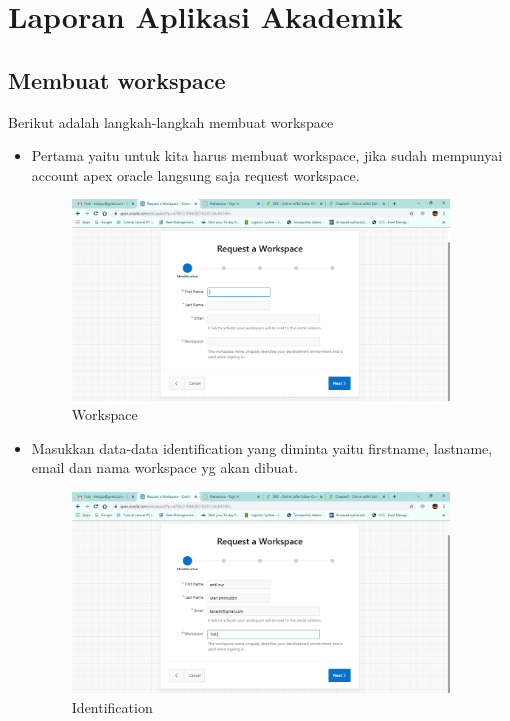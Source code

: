 \chapter{Laporan Aplikasi Akademik}
\section{Membuat workspace}
Berikut adalah langkah-langkah membuat workspace
\begin{itemize}
    \item Pertama yaitu untuk kita harus membuat workspace, jika sudah mempunyai account apex oracle langsung saja request workspace.
    \begin{figure}[!htbp]
        \centering
        \includegraphics[width=10cm]{figures/work1.PNG}
        \caption{Workspace}
    \end{figure}
    
    \item Masukkan data-data identification yang diminta yaitu firstname, lastname, email dan nama workspace yg akan dibuat.
    \begin{figure}[!htbp]
        \centering
        \includegraphics[width=10cm]{figures/work2.PNG}
        \caption{Identification}
    \end{figure}
    
    \newpage
    

\end{itemize}
